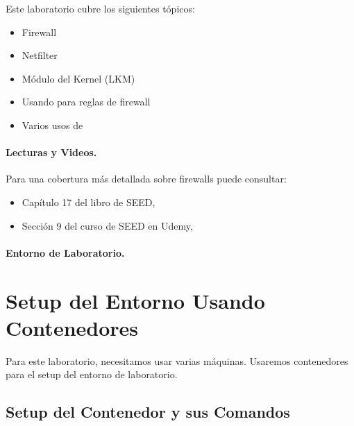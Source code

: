 Este laboratorio cubre los siguientes tópicos:


\begin{itemize}[noitemsep]
\item Firewall
\item Netfilter
\item Módulo del Kernel (LKM)
\item Usando \iptables para reglas de firewall
\item Varios usos de \iptables
\end{itemize}


\paragraph{Lecturas y Videos.}
Para una cobertura más detallada sobre firewalls puede consultar:

\begin{itemize}
\item Capítulo 17 del libro de SEED, \seedbook
\item Sección 9 del curso de SEED en Udemy, \seedisvideo
\end{itemize}


\paragraph{Entorno de Laboratorio.} \seedenvironmentC




\section{Setup del Entorno Usando Contenedores}

Para este laboratorio, necesitamos usar varias máquinas.
Usaremos contenedores para el setup del entorno de laboratorio.



\subsection{Setup del Contenedor y sus Comandos}





